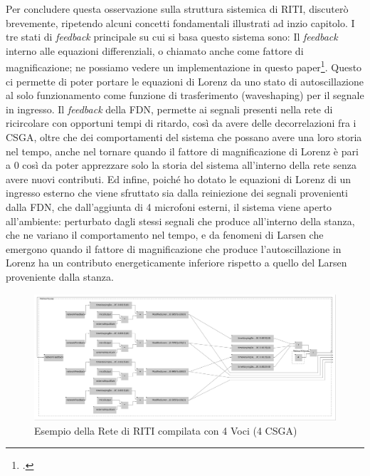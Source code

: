 Per concludere questa osservazione sulla struttura sistemica di RITI,
discuterò brevemente, ripetendo alcuni concetti fondamentali illustrati ad inzio capitolo.
I tre stati di \emph{feedback} principale su cui si basa questo sistema sono:
Il \emph{feedback} interno alle equazioni differenziali, o chiamato anche come fattore di magnificazione; 
ne possiamo vedere un implementazione in questo paper\footcite{liang_difference_2013}.
Questo ci permette di poter portare le equazioni di Lorenz da uno stato di autoscillazione al
solo funzionamento come funzione di trasferimento (waveshaping) per il segnale in ingresso.
Il \emph{feedback} della FDN, permette ai segnali presenti nella rete di ricircolare
con opportuni tempi di ritardo, così da avere delle decorrelazioni fra i CSGA, oltre che dei comportamenti del sistema
che possano avere una loro storia nel tempo, anche nel tornare quando il fattore di magnificazione di Lorenz è pari a 0
così da poter apprezzare solo la storia del sistema all'interno della rete senza avere nuovi contributi.
Ed infine, poiché ho dotato le equazioni di Lorenz di un ingresso esterno che viene sfruttato
sia dalla reiniezione dei segnali provenienti dalla FDN, che dall'aggiunta di 4 microfoni esterni,
il sistema viene aperto all'ambiente: perturbato dagli stessi segnali che produce all'interno della stanza,
che ne variano il comportamento nel tempo, e da fenomeni di Larsen che emergono quando il fattore di 
magnificazione che produce l'autoscillazione in Lorenz ha un contributo energeticamente 
inferiore rispetto a quello del Larsen proveniente dalla stanza.
\clearpage

\begin{figure}[h!]
\begin{center}
    \includegraphics[width=15cm]{figures/RITI4VoiceNetwork.pdf} 
    \caption {Esempio della Rete di RITI compilata con 4 Voci (4 CSGA)}
\end{center}
\end{figure}

